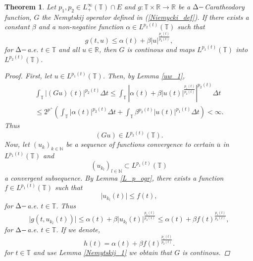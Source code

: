 \documentclass[12pt,a4paper,oneside,titlepage]{article}
\newtheorem{Twierdzenie}{Theorem}
\begin{document}
\begin{Twierdzenie} Let $p_1, p_2 \in L^{\infty}_{+}\left( \mathbb{T} \right) \cap E $ and $g: \mathbb{T} \times \mathbb{R} \rightarrow \mathbb{R}$ be a $\Delta \-- $Caratheodory function, $G$ the Nemytskij operator defined in (\ref{Niemycki_def}).
If there exists a constant $\beta$ and a non-negative function $\alpha \in L^{p_2(t)} \left( \mathbb{T} \right) $ such that
\begin{equation}
g(t,u) \leq \alpha(t) + \beta \vert u \vert^{ \frac{p_1(t)}{p_2(t)}  },
\end{equation}
for $\Delta \-- $a.e. $t \in \mathbb{T}$ and all $u \in \mathbb{R}$, then $G$ is continous and maps $L^{p_1(t)}\left( \mathbb{T} \right)$ into $L^{p_2(t)}\left( \mathbb{T} \right)$.
\begin{proof}
First, let $u \in L^{p_1(t)}\left( \mathbb{T} \right) $. Then, by Lemma \ref{uw_1},
\begin{equation}
\nonumber
\begin{split}
\int_{\mathbb{T}} \vert (Gu)(t) \vert^{p_2(t)} \Delta t \leq \int_{\mathbb{T}} \left\vert \alpha(t) + \beta \vert u(t) \vert^{\frac{p_1(t)}{p_2(t)}} \right\vert^{p_2(t)} \Delta t \\ \leq 2^{p^+} \left(  \int_{\mathbb{T}} \vert \alpha(t) \vert^{p_2(t)} \Delta t + \int_{\mathbb{T}}  \beta^{p_{2}(t)} \left\vert u(t)  \right\vert    ^{p_1(t)} \Delta t \right) < \infty.
\end{split}
\end{equation}
Thus 
\begin{equation}
\nonumber
(Gu) \in L^{p_2(t)}\left( \mathbb{T} \right). 
\end{equation}
Now, let $(u_k)_{k \in \mathbb{N}}$ be a sequence of functions convergence to certain $\overline{u}$  in $ L^{p_1(t)}\left( \mathbb{T} \right)$ and
\begin{equation}
\nonumber
(u_{k_l})_{l \in \mathbb{N}} \subset L^{p_1(t)}\left( \mathbb{T} \right)
\end{equation}
a convergent subsequence. By Lemma \ref{L_p_ogr}, there exists a function $f \in L^{p_1(t)}\left( \mathbb{T} \right)$ such that
\begin{equation}
\nonumber
\vert u_{k_l}(t) \vert \leq f(t),
\end{equation}
for $\Delta \-- $a.e. $t \in \mathbb{T}$.
Thus
\begin{equation}
\vert g(t, u_{k_l}(t)) \vert \leq \alpha (t) + \beta \vert u_{k_l}(t) \vert^{\frac{p_1(t)}{p_2(t)}} \leq \alpha (t) + \beta f(t)^{\frac{p_1(t)}{p_2(t)}},
\end{equation}
for $\Delta \-- $a.e. $t \in \mathbb{T}$.
If we denote, 
\begin{equation}
\nonumber
h(t) = \alpha (t) + \beta f(t)^{\frac{p_1(t)}{p_2(t)}}.
\end{equation}
for $t\in \mathbb{T}$ and use Lemma \ref{Nemytskij_1} we obtain that $G$ is continous.
\end{proof}
\end{Twierdzenie}
\end{document}
